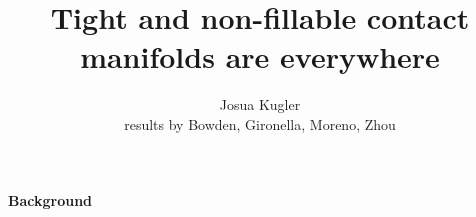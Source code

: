\documentclass{beamer}
\title[] %
{Tight and non-fillable contact manifolds are everywhere}
\subtitle
{}
\author[Josua Kugler] %
{Josua Kugler \texorpdfstring{\\}{,}results by Bowden\inst{\footnote{University of Regensburg}}, Gironella\inst{\footnote{University of Nantes}}, Moreno\inst{\footnote{Heidelberg University}}, Zhou\inst{\footnote{Morningside Center of Mathematics, CAS}}}
\institute%
{Heidelberg University}
\date[MPI Leipzig] %
\newtheorem{conjecture}{Conjecture}
\begin{document}
\begin{frame}
  \titlepage
\end{frame}












    

\begin{frame}
\begin{tcolorbox}
\Huge \begin{center}
    \textbf{Background}
\end{center}
\end{tcolorbox}
\end{frame}
\end{document}
